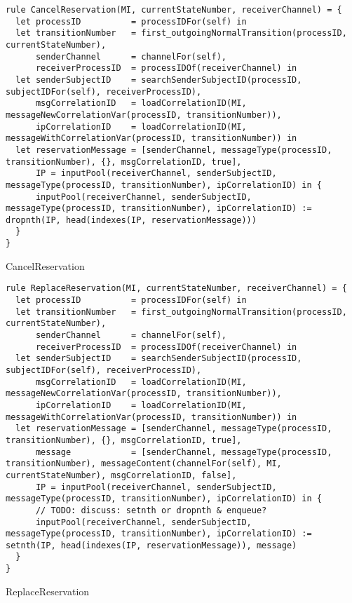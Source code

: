 \begin{listing}[H]
\begin{verbatim}
rule CancelReservation(MI, currentStateNumber, receiverChannel) = {
  let processID          = processIDFor(self) in
  let transitionNumber   = first_outgoingNormalTransition(processID, currentStateNumber),
      senderChannel      = channelFor(self),
      receiverProcessID  = processIDOf(receiverChannel) in
  let senderSubjectID    = searchSenderSubjectID(processID, subjectIDFor(self), receiverProcessID),
      msgCorrelationID   = loadCorrelationID(MI, messageNewCorrelationVar(processID, transitionNumber)),
      ipCorrelationID    = loadCorrelationID(MI, messageWithCorrelationVar(processID, transitionNumber)) in
  let reservationMessage = [senderChannel, messageType(processID, transitionNumber), {}, msgCorrelationID, true],
      IP = inputPool(receiverChannel, senderSubjectID, messageType(processID, transitionNumber), ipCorrelationID) in {
      inputPool(receiverChannel, senderSubjectID, messageType(processID, transitionNumber), ipCorrelationID) := dropnth(IP, head(indexes(IP, reservationMessage)))
  }
}
\end{verbatim}
\caption{CancelReservation}
\label{lst:asm:CancelReservation}
\end{listing}




\begin{listing}[H]
\begin{verbatim}
rule ReplaceReservation(MI, currentStateNumber, receiverChannel) = {
  let processID          = processIDFor(self) in
  let transitionNumber   = first_outgoingNormalTransition(processID, currentStateNumber),
      senderChannel      = channelFor(self),
      receiverProcessID  = processIDOf(receiverChannel) in
  let senderSubjectID    = searchSenderSubjectID(processID, subjectIDFor(self), receiverProcessID),
      msgCorrelationID   = loadCorrelationID(MI, messageNewCorrelationVar(processID, transitionNumber)),
      ipCorrelationID    = loadCorrelationID(MI, messageWithCorrelationVar(processID, transitionNumber)) in
  let reservationMessage = [senderChannel, messageType(processID, transitionNumber), {}, msgCorrelationID, true],
      message            = [senderChannel, messageType(processID, transitionNumber), messageContent(channelFor(self), MI, currentStateNumber), msgCorrelationID, false],
      IP = inputPool(receiverChannel, senderSubjectID, messageType(processID, transitionNumber), ipCorrelationID) in {
      // TODO: discuss: setnth or dropnth & enqueue?
      inputPool(receiverChannel, senderSubjectID, messageType(processID, transitionNumber), ipCorrelationID) := setnth(IP, head(indexes(IP, reservationMessage)), message)
  }
}
\end{verbatim}
\caption{ReplaceReservation}
\label{lst:asm:ReplaceReservation}
\end{listing}





